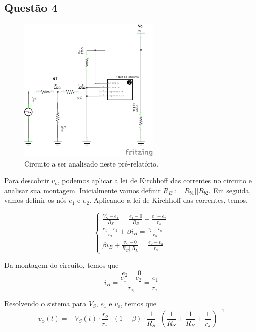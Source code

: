 \documentclass[12pt, a4paper, twoside]{article}
\begin{document}
\subsection{Questão 4}

\begin{figure}[H]
    \centering
    \includegraphics[width=0.6\textwidth]{figs/rel6/ex4.png}
    \caption{Circuito a ser analisado neste pré-relatório.}
\end{figure}

Para descobrir $v_o$, podemos aplicar a lei de Kirchhoff das correntes no circuito e analisar sua montagem. Inicialmente vamos definir $ R_B := R_{b1} || R_{b2} $. Em seguida, vamos definir os nós $e_1$ e $e_2$. Aplicando a lei de Kirchhoff das correntes, temos,

\begin{equation}
    \begin{cases}
        \frac{V_S-e_1}{R_S} = \frac{e_1 - 0}{R_B} + \frac{e_1-e_2}{r_\pi} \\
        \frac{e_1-e_2}{r_\pi} + \beta i_B = \frac{e_2 - v_o}{r_o} \\
        \beta i_B + \frac{v_o - 0}{R_C||R_L} = \frac{e_2 - v_o}{r_o}
    \end{cases}
\end{equation}

Da montagem do circuito, temos que
$$ e_2 = 0 $$
$$ i_B = \frac{e_1 - e_2}{r_\pi} = \frac{e_1}{r_\pi} $$

Resolvendo o sistema para $V_S$, $e_1$ e $v_o$, temos que
$$ v_o(t) = -V_S(t) \cdot \frac{r_o}{r_\pi} \cdot (1+\beta) \cdot \frac{1}{R_S} \cdot \left(\frac{1}{R_S} + \frac{1}{R_B} + \frac{1}{r_\pi} \right)^{-1} $$
\end{document}
